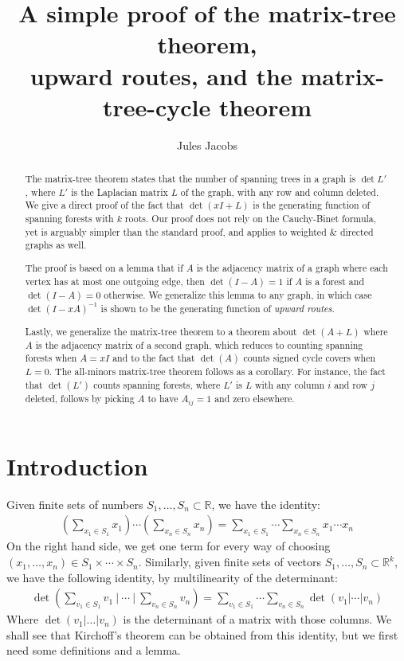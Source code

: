 \documentclass[a4paper, 11pt]{article}
\title{A simple proof of the matrix-tree theorem, \\ upward routes, and the matrix-tree-cycle theorem}
\author{Jules Jacobs}
\newcommand{\R}{\mathbb{R}}
\theoremstyle{definition}
\begin{document}
\maketitle

\begin{abstract}
  The matrix-tree theorem states that the number of spanning trees in a graph is $\det L'$, where $L'$ is the Laplacian matrix $L$ of the graph, with any row and column deleted. We give a direct proof of the fact that $\det(xI + L)$ is the generating function of spanning forests with $k$ roots. Our proof does not rely on the Cauchy-Binet formula, yet is arguably simpler than the standard proof, and applies to weighted \& directed graphs as well.

  The proof is based on a lemma that if $A$ is the adjacency matrix of a graph where each vertex has at most one outgoing edge, then $\det(I - A) = 1$ if $A$ is a forest and $\det(I - A) = 0$ otherwise. We generalize this lemma to any graph, in which case $\det(I-xA)^{-1}$ is shown to be the generating function of \emph{upward routes}.

  Lastly, we generalize the matrix-tree theorem to a theorem about $\det(A + L)$ where $A$ is the adjacency matrix of a second graph, which reduces to counting spanning forests when $A = xI$ and to the fact that $\det(A)$ counts signed cycle covers when $L = 0$. The all-minors matrix-tree theorem follows as a corollary. For instance, the fact that $\det(L')$ counts spanning forests, where $L'$ is $L$ with any column $i$ and row $j$ deleted, follows by picking $A$ to have $A_{ij} = 1$ and zero elsewhere.
\end{abstract}

\section{Introduction}

Given finite sets of numbers $S_1, \dots, S_n \subset \R$, we have the identity:
\begin{align*}
  \left( \sum_{x_1 \in S_1} x_1 \right) \cdots \left( \sum_{x_n \in S_n} x_n \right) =
  \sum_{x_1 \in S_1} \cdots \sum_{x_n \in S_n} x_1 \cdots x_n
\end{align*}
On the right hand side, we get one term for every way of choosing $(x_1,\dots,x_n)\in S_1 \times \cdots \times S_n$. Similarly, given finite sets of vectors $S_1, \dots, S_n \subset \R^k$, we have the following identity, by multilinearity of the determinant:
\begin{align*}
  \det\left(\sum_{v_1 \in S_1} v_1\ \bigg\rvert\ \cdots\ \bigg\rvert\ \sum_{v_n \in S_n} v_n\right) =
  \sum_{v_1 \in S_1} \cdots \sum_{v_n \in S_n} \det \left(v_1 | \cdots | v_n\right)
\end{align*}
Where $\det(v_1 | \dots | v_n)$ is the determinant of a matrix with those columns. We shall see that Kirchoff's theorem can be obtained from this identity, but we first need some definitions and a lemma.
\end{document}
